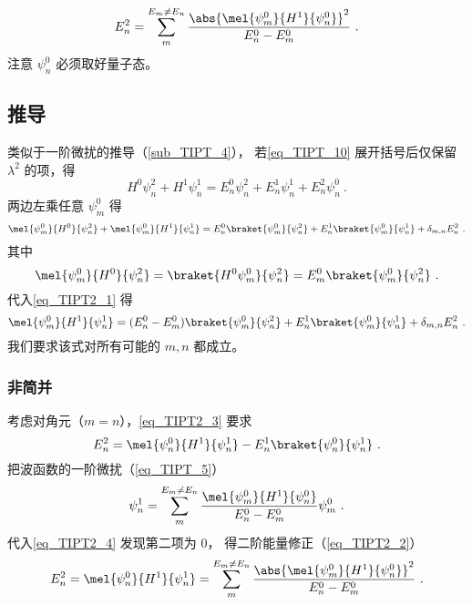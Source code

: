 
\begin{issues}
\issueDraft
\end{issues}


\begin{equation}\label{eq_TIPT2_2}
E_n^2 = \sum_{m}^{E_m\ne E_n} \frac{\abs{\mel{\psi_m^0}{H^1}{\psi_n^0}}^2}{E_n^0-E_m^0}~.
\end{equation}
注意 $\psi_n^0$ 必须取好量子态。

\subsection{推导}
类似于一阶微扰的推导（\autoref{sub_TIPT_4}）， 若\autoref{eq_TIPT_10} 展开括号后仅保留 $\lambda^2$ 的项，得
\begin{equation}
H^0\psi_n^2 + H^1\psi_n^1 = E_n^0\psi_n^2 + E_n^1\psi_n^1 + E_n^2\psi_n^0~.
\end{equation}
两边左乘任意 $\psi_m^0$ 得
\begin{equation}\label{eq_TIPT2_1}
\mel{\psi_m^0}{H^0}{\psi_n^2} + \mel{\psi_m^0}{H^1}{\psi_n^1} = E_n^0\braket{\psi_m^0}{\psi_n^2} + E_n^1\braket{\psi_m^0}{\psi_n^1} + \delta_{m,n}E_n^2~.
\end{equation}
其中
\begin{equation}
\mel{\psi_m^0}{H^0}{\psi_n^2} = \braket{H^0\psi_m^0}{\psi_n^2} = E_m^0\braket{\psi_m^0}{\psi_n^2}~.
\end{equation}
代入\autoref{eq_TIPT2_1} 得
\begin{equation}\label{eq_TIPT2_3}
\mel{\psi_m^0}{H^1}{\psi_n^1} = (E_n^0-E_m^0)\braket{\psi_m^0}{\psi_n^2} + E_n^1\braket{\psi_m^0}{\psi_n^1} + \delta_{m,n}E_n^2~.
\end{equation}
我们要求该式对所有可能的 $m,n$ 都成立。

\subsubsection{非简并}
考虑对角元（$m=n$），\autoref{eq_TIPT2_3} 要求
\begin{equation}\label{eq_TIPT2_4}
E_n^2 = \mel{\psi_n^0}{H^1}{\psi_n^1} - E_n^1\braket{\psi_n^0}{\psi_n^1}~.
\end{equation}
把波函数的一阶微扰（\autoref{eq_TIPT_5}）
\begin{equation}
\psi_n^1 = \sum_m^{E_m\ne E_n} \frac{\mel{\psi_m^0}{H^1}{\psi_n^0}}{E_n^0 - E_m^0}\psi_m^0~.
\end{equation}
代入\autoref{eq_TIPT2_4} 发现第二项为 0， 得二阶能量修正（\autoref{eq_TIPT2_2}）
\begin{equation}
E_n^2 = \mel{\psi_n^0}{H^1}{\psi_n^1} = \sum_{m}^{E_m\ne E_n} \frac{\abs{\mel{\psi_m^0}{H^1}{\psi_n^0}}^2}{E_n^0-E_m^0}~.
\end{equation}


